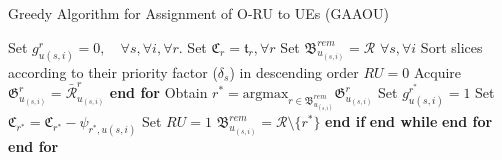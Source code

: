 \documentclass[conference]{IEEEtran}
\begin{document}
\begin{algorithm}
\caption{Greedy Algorithm for Assignment of O-RU to UEs (GAAOU)}\label{alg1}
\begin{algorithmic}[1]
\State Set $g^r_{u(s,i)} = 0, \quad \forall s, \forall i, \forall r$.\label{31}
\State Set $\mathfrak{C}_r = \mathfrak{t}_r, \forall r$  \label{32}
\State Set ${\mathfrak{B}}^{rem}_{u_{(s,i)}} = \mathcal{R}$  $\forall s, \forall i$
\State Sort slices according to their priority factor ($\delta_s$) in descending order
\label{33}
\State $RU = 0$
\State Acquire $\mathfrak{G}^r_{u_{(s,i)}} = \bar{\mathcal{R}}^r_{u_{(s,i)}}$
\EndFor
\State \textbf{end for}
\State Obtain $r^* = \text{argmax}_{r\in{\mathfrak{B}}^{rem}_{u_{(s,i)}}} \mathfrak{G}^r_{u_{(s,i)}}$
\State Set $g^{r^*}_{u(s,i)} = 1$ 
\State Set  $\mathfrak{C}_{r^*} = \mathfrak{C}_{r^*} - \psi_{{r^*},u(s,i)}$
\State Set $RU = 1$ 
\Else
\State  ${\mathfrak{B}}^{rem}_{u_{(s,i)}} = \mathcal{R} \setminus \{{r^*}\} $
\EndIf
\State \textbf{end if}
\EndWhile
\State \textbf{end while}
\EndFor
\State \textbf{end for}
\EndFor
\State \textbf{end for} \label{34}
\end{algorithmic}
\end{algorithm} 
\end{document}
